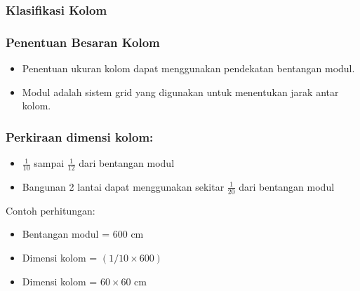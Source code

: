 \documentclass[../main.tex]{subfiles}
\begin{document}
\begin{frame}[t,mycolor=digiPH_leaf,mytitle=standard,dark]
	\frametitle{Klasifikasi Kolom}
\end{frame}



\begin{frame}[label=current,t,mycolor=digiPH_leaf,mytitle=standard,dark]
	\frametitle{Penentuan Besaran Kolom}

	\begin{itemize}

		\item Penentuan ukuran kolom dapat menggunakan pendekatan bentangan modul.

		\item Modul adalah sistem grid yang digunakan untuk menentukan jarak antar kolom.

	\end{itemize}



\end{frame}




\begin{frame}[mytitle=center,c,mycolor=digiPH_ocean,dark]\frametitle{Perkiraan dimensi kolom:}
	\begin{itemize}
		\item $\frac{1}{10}$ sampai $\frac{1}{12}$ dari bentangan modul
		\item Bangunan 2 lantai dapat menggunakan sekitar $\frac{1}{20}$ dari bentangan modul
	\end{itemize}

	\Huge Contoh perhitungan: \normalsize

	\begin{itemize}
		\item Bentangan modul = 600 cm
		\item Dimensi kolom = $(1/10 \times 600)$
		\item Dimensi kolom = $60 \times 60$ cm
	\end{itemize}\end{frame}
\end{document}
